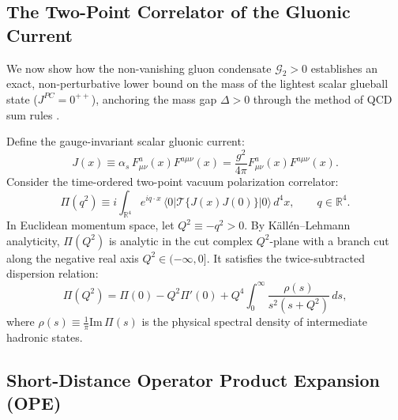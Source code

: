 \subsection{The Two-Point Correlator of the Gluonic Current}
\label{subsec:correlator_gluonic_current}

We now show how the non-vanishing gluon condensate $\mathcal{G}_2 > 0$ establishes an exact, non-perturbative lower bound on the mass of the lightest scalar glueball state ($J^{PC} = 0^{++}$), anchoring the mass gap $\Delta > 0$ through the method of QCD sum rules \cite{ShifmanVainshteinZakharov1979}.

Define the gauge-invariant scalar gluonic current:
\begin{equation}
\label{eq:scalar_current_def}
J(x) \equiv \alpha_s \, F_{\mu\nu}^a(x) F^{a\mu\nu}(x) = \frac{g^2}{4\pi} F_{\mu\nu}^a(x) F^{a\mu\nu}(x).
\end{equation}
Consider the time-ordered two-point vacuum polarization correlator:
\begin{equation}
\label{eq:polarization_correlator_def}
\Pi(q^2) \equiv i \int_{\mathbb{R}^4} e^{i q \cdot x} \, \langle 0 | \mathcal{T} \{ J(x) J(0) \} | 0 \rangle \, d^4x, \qquad q \in \mathbb{R}^4.
\end{equation}
In Euclidean momentum space, let $Q^2 \equiv -q^2 > 0$. By K\"all\'en--Lehmann analyticity, $\Pi(Q^2)$ is analytic in the cut complex $Q^2$-plane with a branch cut along the negative real axis $Q^2 \in (-\infty, 0]$. It satisfies the twice-subtracted dispersion relation:
\begin{equation}
\label{eq:dispersion_relation}
\Pi(Q^2) = \Pi(0) - Q^2 \Pi'(0) + Q^4 \int_0^\infty \frac{\rho(s)}{s^2 (s + Q^2)} \, ds,
\end{equation}
where $\rho(s) \equiv \frac{1}{\pi} \mathrm{Im} \, \Pi(s)$ is the physical spectral density of intermediate hadronic states.

\subsection{Short-Distance Operator Product Expansion (OPE)}
\label{subsec:ope_expansion}

